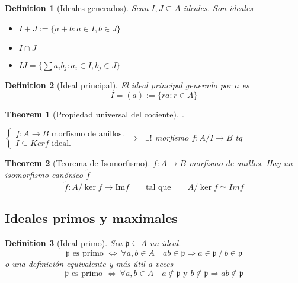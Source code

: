 \documentclass[leqno]{article}
\newtheorem*{theorem}{Theorem}
\newtheorem*{definition}{Definition}
\begin{document}
\begin{definition}[Ideales generados]Sean $I, J \subseteq A$ ideales. Son ideales
  \begin{itemize}[topsep=-6pt, itemsep=0pt]
    \item $I+J := \{a+b: a\in I, b\in J\}$ 
	\item $I\cap J$
	\item $IJ = \{\sum a_ib_j: a_i\in I , b_j \in J\}$
  \end{itemize}
\end{definition}

\begin{definition}[Ideal principal]
  El ideal principal generado por $a$ es
   \[
  I = (a) := \{ra: r \in A\}
  \] 
\end{definition}

\begin{theorem}[Propiedad universal del cociente] .\\
\begin{minipage}{0.7\textwidth}
  $\begin{cases}
f:A \to  B \text{ morfismo de anillos.}\\
I\subseteq Ker f \text{ ideal.}
  \end{cases}\Rightarrow$
$\ \exists ! $ morfismo $\tilde{f}:A/I \to B$ tq
\end{minipage}
\begin{minipage}{0.3\textwidth}
\end{minipage}
\end{theorem}

\begin{theorem}[Teorema de Isomorfismo] $f:A\to B$ morfismo de anillos. Hay un isomorfismo canónico $\tilde{f}$
  \[
  \tilde{f}: A/\ker f \to  \text{Im} f \qquad \text{tal que} \qquad A /\ker f \simeq  Im f
  \] 
\end{theorem}

\subsection{Ideales primos y maximales}
\begin{definition}[Ideal primo] Sea $\mathfrak{p}\subseteq A$ un ideal.
\[
\mathfrak{p} \text{ es primo } 
  \iff \ \forall a, b \in A \quad ab \in \mathfrak{p} \Rightarrow 
    a\in \mathfrak{p} \ /\ b \in \mathfrak{p}
\] 
o una definición equivalente y más útil a veces
\[
\mathfrak{p} \text{ es primo } 
  \iff \ \forall a, b \in A \quad 
    a\not\in \mathfrak{p} \text{ y } b \not\in \mathfrak{p} \Rightarrow ab \not\in \mathfrak{p}
\] 
\end{definition}
\end{document}

